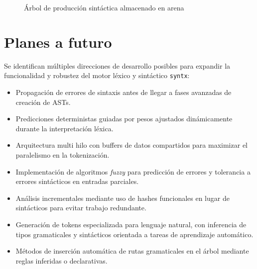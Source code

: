 \documentclass{article}
\begin{document}
\begin{figure}[H]
\centering
{}
\caption{Árbol de producción sintáctica almacenado en arena}
\end{figure}

\section*{Planes a futuro}

Se identifican múltiples direcciones de desarrollo posibles para expandir la funcionalidad y robustez del motor léxico y sintáctico \texttt{syntx}:

\begin{itemize}
  \item Propagación de errores de sintaxis antes de llegar a fases avanzadas de creación de ASTs.
  \item Predicciones deterministas guiadas por pesos ajustados dinámicamente durante la interpretación léxica.
  \item Arquitectura multi hilo con buffers de datos compartidos para maximizar el paralelismo en la tokenización.
  \item Implementación de algoritmos \textit{fuzzy} para predicción de errores y tolerancia a errores sintácticos en entradas parciales.
  \item Análisis incrementales mediante uso de hashes funcionales en lugar de sintácticos para evitar trabajo redundante.
  \item Generación de tokens especializada para lenguaje natural, con inferencia de tipos gramaticales y sintácticos orientada a tareas de aprendizaje automático.
  \item Métodos de inserción automática de rutas gramaticales en el árbol mediante reglas inferidas o declarativas.
\end{itemize}
\end{document}

